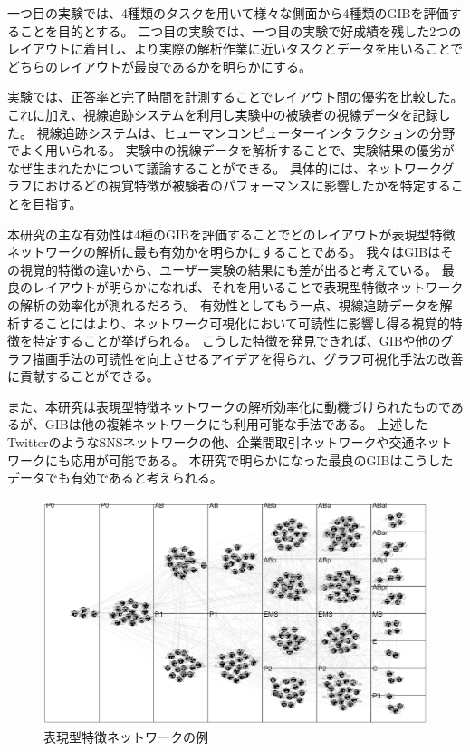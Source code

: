 \documentclass{kuee}
\begin{document}
一つ目の実験では、4種類のタスクを用いて様々な側面から4種類のGIBを評価することを目的とする。
二つ目の実験では、一つ目の実験で好成績を残した2つのレイアウトに着目し、より実際の解析作業に近いタスクとデータを用いることでどちらのレイアウトが最良であるかを明らかにする。

実験では、正答率と完了時間を計測することでレイアウト間の優劣を比較した。
これに加え、視線追跡システムを利用し実験中の被験者の視線データを記録した。
視線追跡システムは、ヒューマンコンピューターインタラクションの分野でよく用いられる。
実験中の視線データを解析することで、実験結果の優劣がなぜ生まれたかについて議論することができる\cite{andrienko2012visual,duchowski2007eye,kurzhals2014evaluating}。
具体的には、ネットワークグラフにおけるどの視覚特徴が被験者のパフォーマンスに影響したかを特定することを目指す。

本研究の主な有効性は4種のGIBを評価することでどのレイアウトが表現型特徴ネットワークの解析に最も有効かを明らかにすることである。
我々はGIBはその視覚的特徴の違いから、ユーザー実験の結果にも差が出ると考えている。
最良のレイアウトが明らかになれば、それを用いることで表現型特徴ネットワークの解析の効率化が測れるだろう。
有効性としてもう一点、視線追跡データを解析することにはより、ネットワーク可視化において可読性に影響し得る視覚的特徴を特定することが挙げられる。
こうした特徴を発見できれば、GIBや他のグラフ描画手法の可読性を向上させるアイデアを得られ、グラフ可視化手法の改善に貢献することができる。

また、本研究は表現型特徴ネットワークの解析効率化に動機づけられたものであるが、GIBは他の複雑ネットワークにも利用可能な手法である。
上述したTwitterのようなSNSネットワークの他、企業間取引ネットワークや交通ネットワークにも応用が可能である。
本研究で明らかになった最良のGIBはこうしたデータでも有効であると考えられる。


\begin{figure}
  \centering
  \label{fig:example_phenotype}
  \includegraphics[width=15cm]{./images/PhenotypeNet.png}
  \caption{表現型特徴ネットワークの例}
\end{figure}
\end{document}

